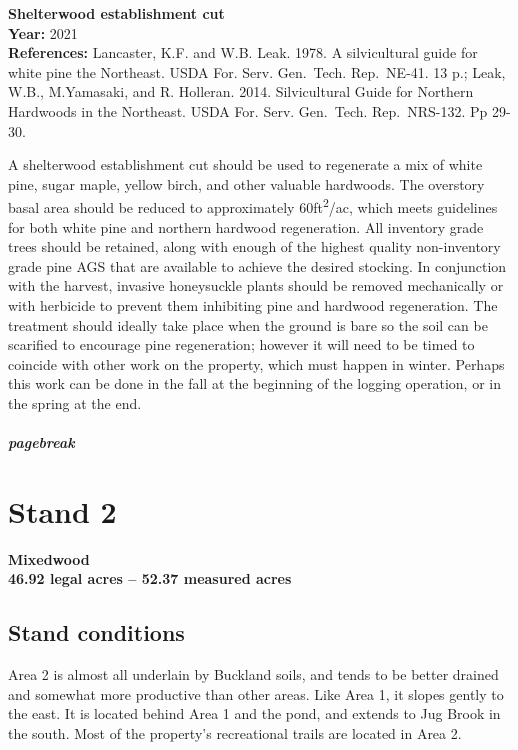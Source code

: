 \documentclass[]{tufte-handout}
\begin{document}
\textbf{Shelterwood establishment cut}\\
\textbf{Year:} 2021\\
\textbf{References:} Lancaster, K.F. and W.B. Leak. 1978. A
silvicultural guide for white pine the Northeast. USDA For. Serv.
Gen.~Tech. Rep.~NE-41. 13 p.; Leak, W.B., M.Yamasaki, and R. Holleran.
2014. Silvicultural Guide for Northern Hardwoods in the Northeast. USDA
For. Serv. Gen.~Tech. Rep.~NRS-132. Pp 29-30.

A shelterwood establishment cut should be used to regenerate a mix of
white pine, sugar maple, yellow birch, and other valuable hardwoods. The
overstory basal area should be reduced to approximately
60ft\textsuperscript{2}/ac, which meets guidelines for both white pine
and northern hardwood regeneration. All inventory grade trees should be
retained, along with enough of the highest quality non-inventory grade
pine AGS that are available to achieve the desired stocking. In
conjunction with the harvest, invasive honeysuckle plants should be
removed mechanically or with herbicide to prevent them inhibiting pine
and hardwood regeneration. The treatment should ideally take place when
the ground is bare so the soil can be scarified to encourage pine
regeneration; however it will need to be timed to coincide with other
work on the property, which must happen in winter. Perhaps this work can
be done in the fall at the beginning of the logging operation, or in the
spring at the end.

\subparagraph{pagebreak}\label{pagebreak-2}

\section{Stand 2}\label{stand-2}

\textbf{Mixedwood}\\
\textbf{46.92 legal acres -- 52.37 measured acres}

\subsection{Stand conditions}\label{stand-conditions-1}

Area 2 is almost all underlain by Buckland soils, and tends to be better
drained and somewhat more productive than other areas. Like Area 1, it
slopes gently to the east. It is located behind Area 1 and the pond, and
extends to Jug Brook in the south. Most of the property's recreational
trails are located in Area 2.
\end{document}
